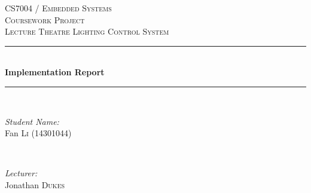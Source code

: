 \begin{titlepage}

\newcommand{\HRule}{\rule{\linewidth}{0.5mm}} %

\center %
 

\textsc{\LARGE CS7004 / Embedded Systems}\\[1.5cm] %
\textsc{\Large Coursework Project}\\[0.5cm] %
\textsc{\Large Lecture Theatre Lighting Control System}\\[0.5cm] %


\HRule \\[0.4cm]
{ \huge \bfseries Implementation Report}\\[0.4cm] %
\HRule \\[1.5cm]
 

\begin{minipage}{0.4\textwidth}
\begin{flushleft} \large
\emph{Student Name:}\\
Fan \textsc{Li} (14301044) %
\end{flushleft}
\end{minipage}
~
\begin{minipage}{0.4\textwidth}
\begin{flushright} \large
\emph{Lecturer:} \\
Jonathan \textsc{Dukes} %
\end{flushright}
\end{minipage}\\[2cm]



\end{titlepage}

